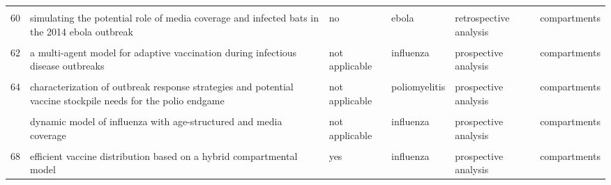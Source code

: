 \documentclass[
]{article}
\begin{document}
\begin{landscape}
\begin{longtable}{l>{\raggedright\arraybackslash}p{3.3cm}l>{\raggedright\arraybackslash}p{3.3cm}>{\raggedright\arraybackslash}p{2cm}l}
\cellcolor{gray!6}{59} & \cellcolor{gray!6}{simulating endogenous dynamics of intervention-capacity deployment: ebola outbreak in liberia} & \cellcolor{gray!6}{no} & \cellcolor{gray!6}{ebola} & \cellcolor{gray!6}{prospective analysis} & \cellcolor{gray!6}{compartments}\\
60 & simulating the potential role of media coverage and infected bats in the 2014 ebola outbreak & no & ebola & retrospective analysis & compartments\\
\addlinespace
\cellcolor{gray!6}{61} & \cellcolor{gray!6}{a mathematical model of ebola virus disease: using sensitivity analysis to determine effective intervention targets} & \cellcolor{gray!6}{no} & \cellcolor{gray!6}{ebola} & \cellcolor{gray!6}{prospective analysis} & \cellcolor{gray!6}{compartments}\\
62 & a multi-agent model for adaptive vaccination during infectious disease outbreaks & not applicable & influenza & prospective analysis & compartments\\
\cellcolor{gray!6}{63} & \cellcolor{gray!6}{assessing the efficiency of movement restriction as a control strategy of ebola} & \cellcolor{gray!6}{not applicable} & \cellcolor{gray!6}{ebola} & \cellcolor{gray!6}{prospective analysis} & \cellcolor{gray!6}{compartments}\\
64 & characterization of outbreak response strategies and potential vaccine stockpile needs for the polio endgame & not applicable & poliomyelitis & prospective analysis & compartments\\
\cellcolor{gray!6}{65} & \cellcolor{gray!6}{designing public health policies to mitigate the adverse consequences of rural-urban migration via meta-population modeling} & \cellcolor{gray!6}{not applicable} & \cellcolor{gray!6}{measles} & \cellcolor{gray!6}{prospective analysis} & \cellcolor{gray!6}{compartments}\\
\addlinespace
66 & dynamic model of influenza with age-structured and media coverage & not applicable & influenza & prospective analysis & compartments\\
\cellcolor{gray!6}{67} & \cellcolor{gray!6}{economic evaluation of individual school closure strategies: the hong kong 2009 h1n1 pandemic} & \cellcolor{gray!6}{yes} & \cellcolor{gray!6}{influenza} & \cellcolor{gray!6}{retrospective analysis} & \cellcolor{gray!6}{compartments}\\
68 & efficient vaccine distribution based on a hybrid compartmental model & yes & influenza & prospective analysis & compartments\\

\end{longtable}
\end{landscape}
\end{document}
